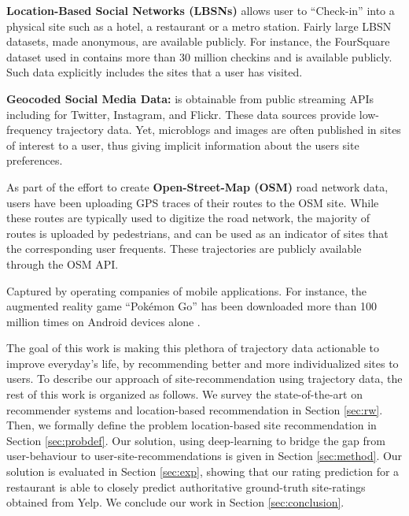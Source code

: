 \begin{compactitem}
\item {\bf Location-Based Social Networks (LBSNs)} allows user to ``Check-in'' into a physical site such as a hotel, a restaurant or a metro station. Fairly large LBSN datasets, made anonymous, are available publicly. For instance, the FourSquare dataset used in \cite{yang2014modeling} contains more than 30 million checkins and is available publicly. Such data explicitly includes the sites that a user has visited.
\item {\bf Geocoded Social Media Data: } is obtainable from public streaming APIs including for Twitter, Instagram, and Flickr. These data sources provide low-frequency trajectory data. Yet, microblogs and images are often published in sites of interest to a user, thus giving implicit information about the users site preferences.
\item  As part of the effort to create {\bf Open-Street-Map (OSM)} \cite{OSM,hw-osmugsm-08} road network data, users have been uploading GPS traces of their routes to the OSM site. While these routes are typically used to digitize the road network, the majority of routes is uploaded by pedestrians, and can be used as an indicator of sites that the corresponding user frequents. These trajectories are publicly available through the OSM API.
\item Captured by operating companies of mobile applications. For instance, the augmented reality game ``Pok\'emon Go'' has been downloaded more than 100 million times on Android devices alone \cite{pokemongo}.
\end{compactitem}
The goal of this work is making this plethora of trajectory data actionable to improve everyday's life, by recommending better and more individualized sites to users.
To describe our approach of site-recommendation using trajectory data, the rest of this work is organized as follows. We survey the state-of-the-art on recommender systems and location-based recommendation in Section \ref{sec:rw}. Then, we formally define the problem location-based site recommendation in Section \ref{sec:probdef}. Our solution, using deep-learning to bridge the gap from user-behaviour to user-site-recommendations is given in Section \ref{sec:method}. Our solution is evaluated in Section \ref{sec:exp}, showing that our rating prediction for a restaurant is able to closely predict authoritative ground-truth site-ratings obtained from Yelp. We conclude our work in Section \ref{sec:conclusion}.  